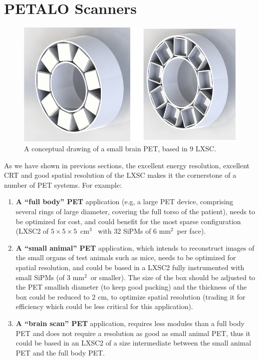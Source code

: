 \section{PETALO Scanners}
\label{sec.pets}


\begin{figure}[!htb]
	\centering
	\includegraphics[scale=0.4]{img/SAP.png}
	\caption{\label{fig.smallPet} A conceptual drawing of a small brain PET, based in 9 LXSC. }
\end{figure}

As we have shown in previous sections, the excellent energy resolution, excellent CRT and good spatial resolution of the LXSC makes it the cornerstone of a number of PET systems.  For example:

\begin{enumerate}
\item {\bf A ``full body'' PET} application (e.g, a large PET device, comprising several rings of large diameter, covering the full torso of the patient), needs to be optimized for cost, and could benefit for the most sparse configuration (LXSC2 of $5\times5\times5$~cm$^3$~ with 32 SiPMs of 6 mm$^2$~per face).
\item {\bf A ``small animal'' PET} application, which intends to reconstruct images of the small organs of test animals such as mice, needs to be optimized for spatial resolution, and could be based in a LXSC2 fully instrumented with small SiPMs (of 3 mm$^2$~or smaller). The size of the box should be adjusted to the PET smallish diameter (to keep good packing) and the thickness of the box could be reduced to 2 cm, to optimize spatial resolution (trading it for efficiency which could be less critical for this application).
\item {\bf A ``brain scan'' PET} application, requires less modules than a full body PET and does not require a resolution as good as small animal PET, thus it could be based in an LXSC2 of a size intermediate between the small animal PET and the full body PET.
\end{enumerate}

